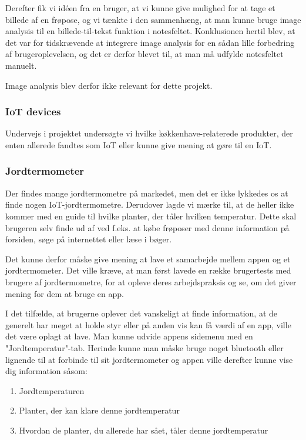 Derefter fik vi idéen fra en bruger, at vi kunne give mulighed for at tage et billede af en frøpose, og vi tænkte i den sammenhæng, at man kunne bruge image analysis til en billede-til-tekst funktion i notesfeltet. Konklusionen hertil blev, at det var for tidskrævende at integrere image analysis for en sådan lille forbedring af brugeroplevelsen, og det er derfor blevet til, at man må udfylde notesfeltet manuelt. 

Image analysis blev derfor ikke relevant for dette projekt.

\subsubsection{IoT devices}
Undervejs i projektet undersøgte vi hvilke køkkenhave-relaterede produkter, der enten allerede fandtes som IoT eller kunne give mening at gøre til en IoT.

\subsubsection*{Jordtermometer}
Der findes mange jordtermometre på markedet, men det er ikke lykkedes os at finde nogen IoT-jordtermometre. Derudover lagde vi mærke til, at de heller ikke kommer med en guide til hvilke planter, der tåler hvilken temperatur. Dette skal brugeren selv finde ud af ved f.eks. at købe frøposer med denne information på forsiden, søge på internettet eller læse i bøger. 

Det kunne derfor måske give mening at lave et samarbejde mellem appen og et jordtermometer. Det ville kræve, at man først lavede en række brugertests med brugere af jordtermometre, for at opleve deres arbejdspraksis og se, om det giver mening for dem at bruge en app.

I det tilfælde, at brugerne oplever det vanskeligt at finde information, at de generelt har meget at holde styr eller på anden vis kan få værdi af en app, ville det være oplagt at lave. Man kunne udvide appens sidemenu med en "Jordtemperatur"-tab. Herinde kunne man måske bruge noget bluetooth eller lignende til at forbinde til sit jordtermometer og appen ville derefter kunne vise dig information såsom:

\begin{enumerate}
    \item{Jordtemperaturen}
    \item{Planter, der kan klare denne jordtemperatur}
    \item{Hvordan de planter, du allerede har sået, tåler denne jordtemperatur}
\end{enumerate}

